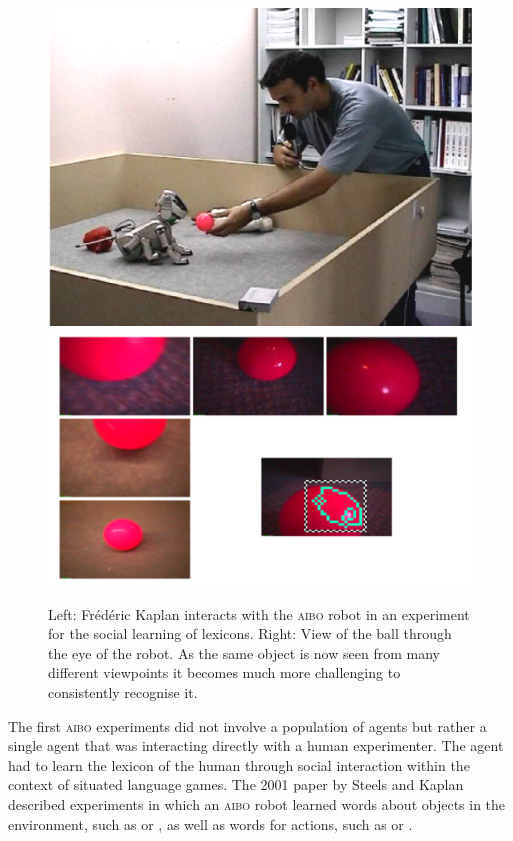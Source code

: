 \begin{figure}[htbp]
  \centerline{\includegraphics[width=.50\textwidth]{chap10/figs/look-ball.pdf}
\includegraphics[width=.45\textwidth]{chap10/figs/views-ball.pdf}}
\caption{\label{f:look-ball}Left: Fr\'{e}d\'{e}ric Kaplan interacts with the \textsc{aibo} robot in an experiment for the social learning of lexicons.
Right: View of the ball through the eye of the robot. As the same object is now seen from many different viewpoints it 
becomes much more challenging to consistently recognise it.}
\end{figure}
The first \textsc{aibo} experiments did not involve a population of agents but rather a single agent that was interacting directly with a human
experimenter. The agent had to learn the lexicon of the human through social 
interaction within the context of situated language games. The 2001
paper  by Steels and Kaplan \nocite{Steels:01h} described experiments in which an \textsc{aibo} robot 
learned words about objects in the environment, such as  or , as well as words for actions, such as 
 or . 

